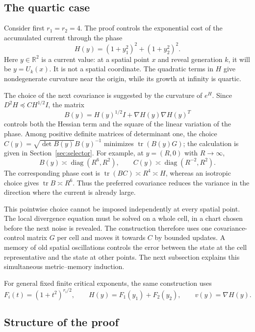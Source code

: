 \documentclass[11pt]{article}
\theoremstyle{definition}
\theoremstyle{remark}
\numberwithin{equation}{section}
\newcommand{\R}{\mathbb R}
\newcommand{\tr}{\operatorname{tr}}
\begin{document}
\subsection{The quartic case}

Consider first $r_1=r_2=4$. The proof controls the exponential
cost of the accumulated current through the phase
\[
 H(y)=(1+y_1^2)^2+(1+y_2^2)^2.
\]
Here $y\in\R^2$ is a current value: at a spatial point $x$ and
reveal generation $k$, it will be $y=U_k(x)$. It is not a spatial
coordinate. The quadratic terms in $H$ give nondegenerate curvature
near the origin, while its growth at infinity is quartic.

The choice of the next covariance is suggested by the curvature
of $e^H$. Since $D^2H\preceq C H^{1/2}I$, the matrix
\[
 B(y)=H(y)^{1/2}I+\nabla H(y)\nabla H(y)^T
\]
controls both the Hessian term and the square of the linear
variation of the phase. Among positive definite matrices of
determinant one, the choice
$C(y)=\sqrt{\det B(y)}B(y)^{-1}$ minimizes $\tr(B(y)G)$;
the calculation is given in Section~\ref{sec:selector}.
For example, at $y=(R,0)$ with $R\to\infty$,
\[
 B(y)\asymp\operatorname{diag}(R^6,R^2),\qquad
 C(y)\asymp\operatorname{diag}(R^{-2},R^2).
\]
The corresponding phase cost is $\tr(BC)\asymp R^4\asymp H$,
whereas an isotropic choice gives $\tr B\asymp R^6$.
Thus the preferred covariance reduces the variance in the direction
where the current is already large.

This pointwise choice cannot be imposed independently at every
spatial point. The local divergence equation must be solved on a
whole cell, in a chart chosen before the next noise is revealed.
The construction therefore uses one covariance-control matrix $G$
per cell and moves it towards $C$ by bounded updates. A memory of
old spatial oscillations controls the error between the state at
the cell representative and the state at other points. The next
subsection explains this simultaneous metric--memory induction.

For general fixed finite critical exponents, the same construction
uses
\begin{equation}\label{eq:phaseH}
 F_i(t)=(1+t^2)^{r_i/2},\qquad
 H(y)=F_1(y_1)+F_2(y_2),\qquad v(y)=\nabla H(y).
\end{equation}

\subsection{Structure of the proof}
\end{document}
